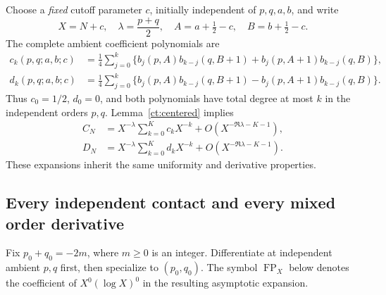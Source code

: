 Choose a \emph{fixed} cutoff parameter $c$, initially independent of
$p,q,a,b$, and write
\begin{equation}\label{ct:fixed-cutoff}
 X=N+c,\quad \lambda=\frac{p+q}{2},\quad
 A=a+\tfrac12-c,\quad B=b+\tfrac12-c.
\end{equation}
The complete ambient coefficient polynomials are
\begin{align}
 c_k(p,q;a,b;c)
 &=\frac14\sum_{j=0}^k\bigl\{
 b_j(p,A)b_{k-j}(q,B+1)+b_j(p,A+1)b_{k-j}(q,B)\bigr\},
                         \label{ct:ck}\\
 d_k(p,q;a,b;c)
 &=\frac14\sum_{j=0}^k\bigl\{
 b_j(p,A)b_{k-j}(q,B+1)-b_j(p,A+1)b_{k-j}(q,B)\bigr\}.
                         \label{ct:dk}
\end{align}
Thus $c_0=1/2$, $d_0=0$, and both polynomials have total degree at most
$k$ in the independent orders $p,q$. Lemma~\ref{ct:centered} implies
\begin{align}
 C_N&=X^{-\lambda}\sum_{k=0}^Kc_kX^{-k}
          +O(X^{-\Re\lambda-K-1}),\label{ct:Cexp}\\
 D_N&=X^{-\lambda}\sum_{k=0}^Kd_kX^{-k}
          +O(X^{-\Re\lambda-K-1}).\label{ct:Dexp}
\end{align}
These expansions inherit the same uniformity and derivative properties.

\subsection{Every independent contact and every mixed order derivative}

Fix $p_0+q_0=-2m$, where $m\ge0$ is an integer. Differentiate at independent
ambient $p,q$ first, then specialize to $(p_0,q_0)$. The symbol
$\operatorname{FP}_X$ below denotes the coefficient of
$X^0(\log X)^0$ in the resulting asymptotic expansion.

